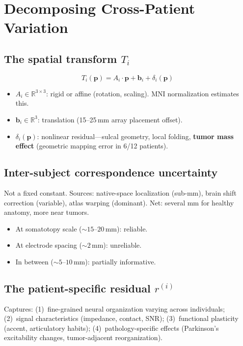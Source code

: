 \documentclass[11pt,letterpaper]{article}
\newcommand{\bfp}{\mathbf{p}}
\newcommand{\bfb}{\mathbf{b}}
\newcommand{\R}{\mathbb{R}}
\begin{document}
\section{Decomposing Cross-Patient Variation}

\subsection{The spatial transform \texorpdfstring{$T_i$}{Ti}}

\begin{equation}\label{eq:transform}
T_i(\bfp) = A_i \cdot \bfp + \bfb_i + \delta_i(\bfp)
\end{equation}
\begin{itemize}[leftmargin=2em]
\item $A_i \in \R^{3 \times 3}$: rigid or affine (rotation, scaling). MNI normalization estimates this.
\item $\bfb_i \in \R^3$: translation (15--25\,mm array placement offset).
\item $\delta_i(\bfp)$: nonlinear residual---sulcal geometry, local folding, \textbf{tumor mass effect} (geometric mapping error in 6/12 patients).
\end{itemize}

\subsection{Inter-subject correspondence uncertainty}

Not a fixed constant. Sources: native-space localization (sub-mm), brain shift correction (variable), atlas warping (dominant). Net: several mm for healthy anatomy, more near tumors.
\begin{itemize}[leftmargin=2em]
\item At somatotopy scale (${\sim}15$--$20$\,mm): reliable.
\item At electrode spacing (${\sim}2$\,mm): unreliable.
\item In between (${\sim}5$--$10$\,mm): partially informative.
\end{itemize}

\subsection{The patient-specific residual \texorpdfstring{$r^{(i)}$}{r(i)}}

Captures: (1)~fine-grained neural organization varying across individuals; (2)~signal characteristics (impedance, contact, SNR); (3)~functional plasticity (accent, articulatory habits); (4)~pathology-specific effects (Parkinson's excitability changes, tumor-adjacent reorganization).
\end{document}

